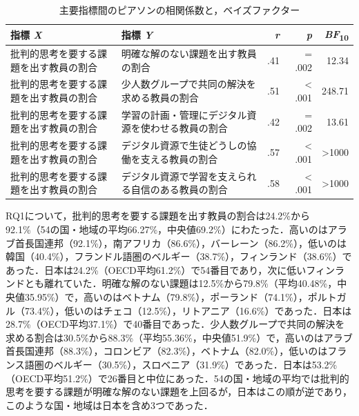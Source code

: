 \documentclass[a4paper,10pt,twocolumn]{ltjsarticle}
\makeatletter
\renewcommand{\section}{\@startsection{section}{1}{\z@}{1.1\Cvs \@plus.4\Cdp \@minus.2\Cdp}{.5\Cvs \@plus.2\Cdp}{\normalfont\gtfamily\bfseries\large}}
\makeatother
\begin{document}
\begin{table}[!t]
\caption{主要指標間のピアソンの相関係数と，ベイズファクター}
\centering\small
\begin{tabular}{>{\raggedright\arraybackslash}p{6.4cm}>{\raggedright\arraybackslash}p{6.4cm}rrr}
\toprule
指標 \textit{X} & 指標 \textit{Y} & \textit{r} & \textit{p} & \textit{BF}\textsubscript{10} \\
\midrule
批判的思考を要する課題を出す教員の割合 & 明確な解のない課題を出す教員の割合 & .41 & = .002 & 12.34 \\
批判的思考を要する課題を出す教員の割合 & 少人数グループで共同の解決を求める教員の割合 & .51 & < .001 & 248.71 \\
批判的思考を要する課題を出す教員の割合 & 学習の計画・管理にデジタル資源を使わせる教員の割合 & .42 & = .002 & 13.61 \\
批判的思考を要する課題を出す教員の割合 & デジタル資源で生徒どうしの協働を支える教員の割合 & .57 & < .001 & >1000 \\
批判的思考を要する課題を出す教員の割合 & デジタル資源で学習を支えられる自信のある教員の割合 & .58 & < .001 & >1000 \\
\bottomrule
\end{tabular}
\par{}
\end{table}
\section{結果}
RQ1について，批判的思考を要する課題を出す教員の割合は24.2\%から92.1\%（54の国・地域の平均66.27\%，中央値69.2\%）にわたった．高いのはアラブ首長国連邦（92.1\%），南アフリカ（86.6\%），バーレーン（86.2\%），低いのは韓国（40.4\%），フランドル語圏のベルギー（38.7\%），フィンランド（38.6\%）であった．日本は24.2\%（OECD平均61.2\%）で54番目であり，次に低いフィンランドとも離れていた．明確な解のない課題は12.5\%から79.8\%（平均40.48\%，中央値35.95\%）で，高いのはベトナム（79.8\%），ポーランド（74.1\%），ポルトガル（73.4\%），低いのはチェコ（12.5\%），リトアニア（16.6\%）であった．日本は28.7\%（OECD平均37.1\%）で40番目であった．少人数グループで共同の解決を求める割合は30.5\%から88.3\%（平均55.36\%，中央値51.9\%）で，高いのはアラブ首長国連邦（88.3\%），コロンビア（82.3\%），ベトナム（82.0\%），低いのはフランス語圏のベルギー（30.5\%），スロベニア（31.9\%）であった．日本は53.2\%（OECD平均51.2\%）で26番目と中位にあった．54の国・地域の平均では批判的思考を要する課題が明確な解のない課題を上回るが，日本はこの順が逆であり，このような国・地域は日本を含め3つであった．
\end{document}
